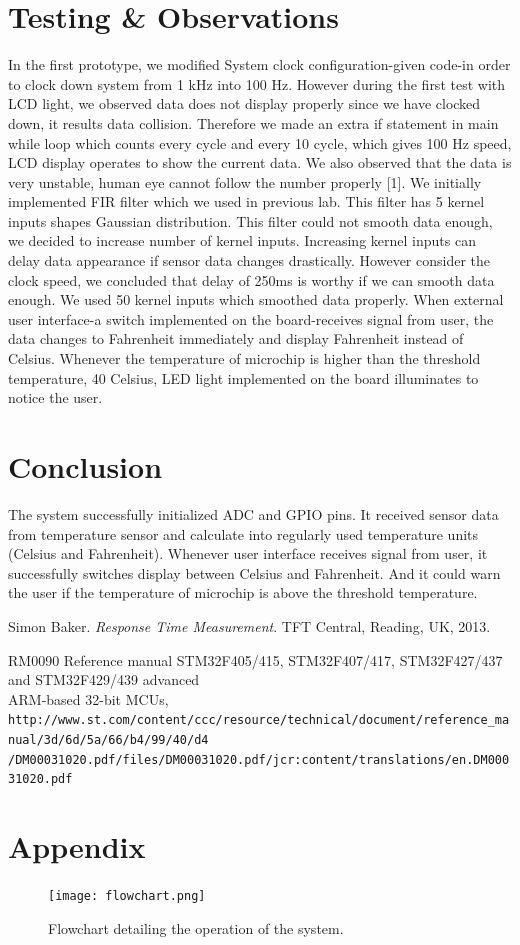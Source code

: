\documentclass{article}
\begin{document}
\section{Testing \& Observations}
In the first prototype, we modified System clock configuration-given code-in order to clock down system from 1 kHz into 100 Hz. However during the first test with LCD light, we observed data does not display properly since we have clocked down, it results data collision. Therefore we made an extra if statement in main while loop which counts every cycle and every 10 cycle, which gives 100 Hz speed, LCD display operates to show the current data. We also observed that the data is very unstable, human eye cannot follow the number properly [1]. We initially implemented FIR filter which we used in previous lab. This filter has 5 kernel inputs shapes Gaussian distribution. This filter could not smooth data enough, we decided to increase number of kernel inputs. Increasing kernel inputs can delay data appearance if sensor data changes drastically. However consider the clock speed, we concluded that delay of 250ms is worthy if we can smooth data enough. We used 50 kernel inputs which smoothed data properly. When external user interface-a switch implemented on the board-receives signal from user, the data changes to Fahrenheit immediately and display Fahrenheit instead of Celsius. Whenever the temperature of microchip is higher than the threshold temperature, 40 Celsius, LED light implemented on the board illuminates to notice the user.

\section{Conclusion}
The system successfully initialized ADC and GPIO pins. It received sensor data from temperature sensor and calculate into regularly used temperature units (Celsius and Fahrenheit). Whenever user interface receives signal from user, it successfully switches display between Celsius and Fahrenheit. And it could warn the user if the temperature of microchip is above the threshold temperature.

\begin{thebibliography}{9}
Simon Baker. 
\textit{Response Time Measurement}. 
TFT Central, Reading, UK, 2013.
 
{RM0090 Reference manual STM32F405/415, STM32F407/417, STM32F427/437 and STM32F429/439 advanced\\ ARM{\textregistered}-based 32-bit MCUs},
\\\texttt{http://www.st.com/content/ccc/resource/technical/document/reference{\_}manual/3d/6d/5a/66/b4/99/40/d4\\/DM00031020.pdf/files/DM00031020.pdf/jcr:content/translations/en.DM00031020.pdf}
\end{thebibliography}




\newpage
\section{Appendix}
\begin{figure}[!htb]
\begin{center}
\texttt{[image: flowchart.png]} %
\caption{Flowchart detailing the operation of the system.}
\label{fig:fc}
\end{center}
\end{figure}
\end{document}
